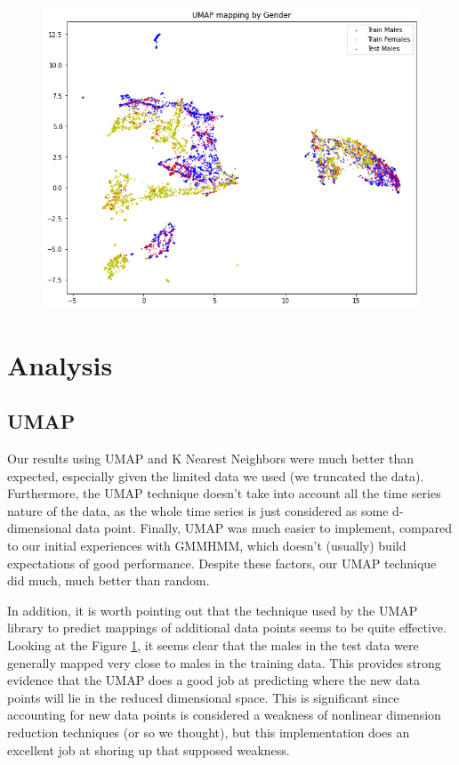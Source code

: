 \documentclass[11pt]{article}
\newcommand{\0}{{\vec  0 }}
\newcommand{\1}{{\mathbbm{  1} }}
\begin{document}
    \begin{figure}
        \centering
        \includegraphics[width=0.7\linewidth]{UMAPGenderCompare}
        \caption{}
        \label{fig:umapgendercompare}
    \end{figure}
    
    \section{Analysis}
    
    \subsection{UMAP}
    Our results using UMAP and K Nearest Neighbors were much better than expected, especially given the limited data we used (we truncated the data). Furthermore, the UMAP technique doesn’t take into account all the time series nature of the data, as the whole time series is just considered as some d-dimensional data point. Finally, UMAP was much easier to implement, compared to our initial experiences with GMMHMM, which doesn’t (usually) build expectations of good performance. Despite these factors, our UMAP technique did much, much better than random. 
    
    In addition, it is worth pointing out that the technique used by the UMAP library to predict mappings of additional data points seems to be quite effective. Looking at the Figure \ref{fig:umapgendercompare}, it seems clear that the males in the test data were generally mapped very close to males in the training data. This provides strong evidence that the UMAP does a good job at predicting where the new data points will lie in the reduced dimensional space. This is significant since accounting for new data points is considered a weakness of nonlinear dimension reduction techniques (or so we thought), but this implementation does an excellent job at shoring up that supposed weakness. 
    
\end{document}
